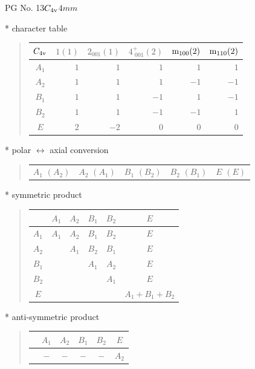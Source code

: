 \documentclass[fleqn,8pt,landscape]{jsarticle}
\begin{document}
\setcounter{MaxMatrixCols}{32}

\renewcommand{\tablename}{Table~}
\renewcommand{\figurename}{Figure~}
\begin{center}
\LARGE
PG No. 13\quad$C_{\rm 4v}$\quad$4mm$\quad[ tetragonal ]
\end{center}

* character table
\begin{quote}
\begin{tabular}{crrrrr} \hline \hline
$ C_{\rm 4v} $ & $ 1(1) $ & $ 2{}_{001}(1) $ & $ 4^{+}_{\,\,001}(2) $ & $ {\rm m}_{100}(2) $ & $ {\rm m}_{110}(2) $ \\ \hline
$ A_{1} $ & $ 1 $ & $ 1 $ & $ 1 $ & $ 1 $ & $ 1 $ \\
$ A_{2} $ & $ 1 $ & $ 1 $ & $ 1 $ & $ -1 $ & $ -1 $ \\
$ B_{1} $ & $ 1 $ & $ 1 $ & $ -1 $ & $ 1 $ & $ -1 $ \\
$ B_{2} $ & $ 1 $ & $ 1 $ & $ -1 $ & $ -1 $ & $ 1 $ \\
$ E $ & $ 2 $ & $ -2 $ & $ 0 $ & $ 0 $ & $ 0 $ \\
 \hline \hline
\end{tabular}
\end{quote}

* polar $\leftrightarrow$ axial conversion
\begin{quote}
\begin{tabular}{ccccc}
$ A_{1}\,\,(A_{2}) $ & $ A_{2}\,\,(A_{1}) $ & $ B_{1}\,\,(B_{2}) $ & $ B_{2}\,\,(B_{1}) $ & $ E\,\,(E) $
\end{tabular}
\end{quote}

* symmetric product
\begin{quote}
\begin{tabular}{c|ccccc} \hline \hline
 & $ A_{1} $ & $ A_{2} $ & $ B_{1} $ & $ B_{2} $ & $ E $ \\ \hline
$ A_{1} $ & $ A_{1} $ & $ A_{2} $ & $ B_{1} $ & $ B_{2} $ & $ E $ \\
$ A_{2} $ & $  $ & $ A_{1} $ & $ B_{2} $ & $ B_{1} $ & $ E $ \\
$ B_{1} $ & $  $ & $  $ & $ A_{1} $ & $ A_{2} $ & $ E $ \\
$ B_{2} $ & $  $ & $  $ & $  $ & $ A_{1} $ & $ E $ \\
$ E $ & $  $ & $  $ & $  $ & $  $ & $ A_{1} + B_{1} + B_{2} $ \\
 \hline \hline
\end{tabular}
\end{quote}

* anti-symmetric product
\begin{quote}
\begin{tabular}{cccccc} \hline \hline
 & $ A_{1} $ & $ A_{2} $ & $ B_{1} $ & $ B_{2} $ & $ E $ \\ \hline
$  $ & $ - $ & $ - $ & $ - $ & $ - $ & $ A_{2} $ \\
 \hline \hline
\end{tabular}
\end{quote}
\end{document}
